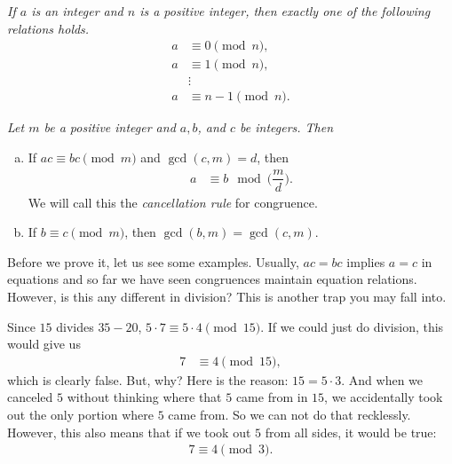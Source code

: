 \documentclass{subfile}
\begin{document}
	
	\begin{proposition}\slshape
		If $a$ is an integer and $n$ is a positive integer, then exactly one of the following relations holds.
			\begin{align*}
				a &\equiv 0 \pmod n,\\
				a &\equiv 1 \pmod n,\\
				  &\vdots\\
				a &\equiv n-1 \pmod{n}.
			\end{align*}
	\end{proposition}
	
	
	\begin{theorem}\slshape
		Let $m$ be a positive integer and $a, b$, and $c$ be integers. Then
		\begin{enumerate}[(a)]
			\item If $ac \equiv bc \pmod m$ and $\gcd(c,m)=d$, then 
				\begin{align*}
					 a & \equiv b \mod{\Big(\dfrac{m}{d}\Big)}. 
				 \end{align*}
			We will call this the \textit{cancellation rule} for congruence.
			\item If $b \equiv c \pmod m$, then $\gcd(b,m)=\gcd(c,m)$.
		\end{enumerate}
	\end{theorem}
Before we prove it, let us see some examples. Usually, $ac=bc$ implies $a=c$ in equations and so far we have seen congruences maintain equation relations. However, is this any different in division? This is another trap you may fall into.

Since $15$ divides $35-20$, $5\cdot7\equiv5\cdot4\pmod{15}$. If we could just do division, this would give us
	\begin{align*}
		7
			& \equiv4\pmod{15},
	\end{align*}
which is clearly false. But, why? Here is the reason: $15=5\cdot3$. And when we canceled $5$ without thinking where that $5$ came from in $15$, we accidentally took out the only portion where $5$ came from. So we can not do that recklessly. However, this also means that if we took out $5$ from all sides, it would be true:
	\begin{align*}
		7\equiv4\pmod{3}.
	\end{align*}
\end{document}
